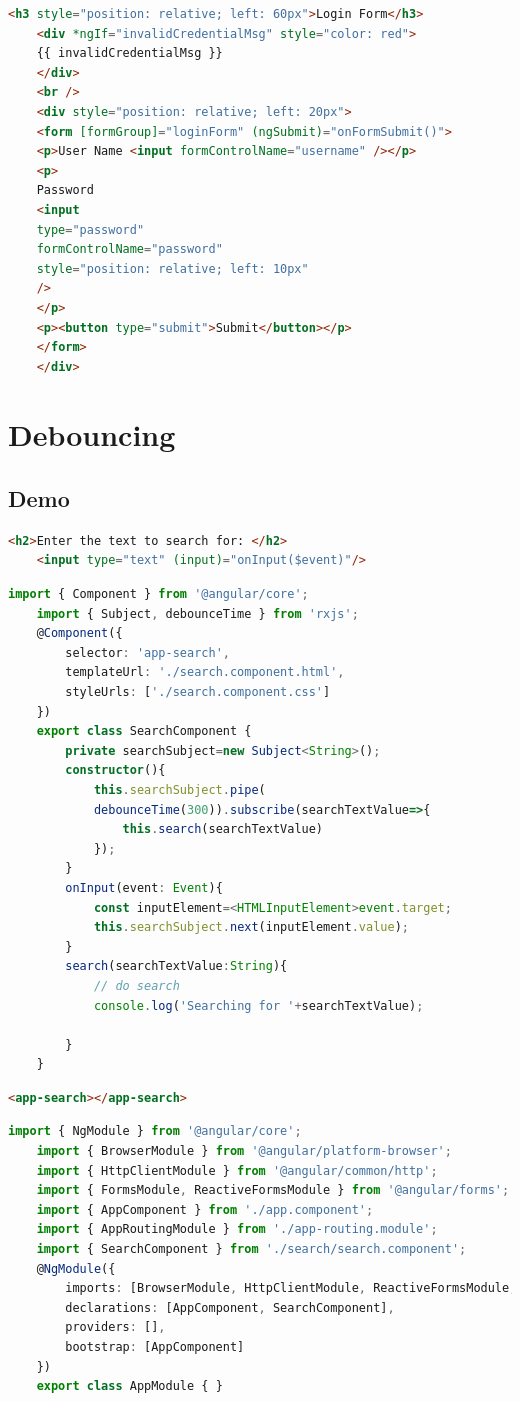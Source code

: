 \documentclass{report}
\begin{document}
\begin{lstlisting}[caption=login.component.html, language=HTML]
	<h3 style="position: relative; left: 60px">Login Form</h3>
	<div *ngIf="invalidCredentialMsg" style="color: red">
	{{ invalidCredentialMsg }}
	</div>
	<br />
	<div style="position: relative; left: 20px">
	<form [formGroup]="loginForm" (ngSubmit)="onFormSubmit()">
	<p>User Name <input formControlName="username" /></p>
	<p>
	Password
	<input
	type="password"
	formControlName="password"
	style="position: relative; left: 10px"
	/>
	</p>
	<p><button type="submit">Submit</button></p>
	</form>
	</div>
\end{lstlisting}

\chapter{Debouncing}
\section{Demo}

\begin{lstlisting}[caption=search-component.html, language=HTML]
	<h2>Enter the text to search for: </h2>
	<input type="text" (input)="onInput($event)"/>
\end{lstlisting}


\begin{lstlisting}[caption=search.component.ts, language=Typescript]
	import { Component } from '@angular/core';
	import { Subject, debounceTime } from 'rxjs';
	@Component({
		selector: 'app-search',
		templateUrl: './search.component.html',
		styleUrls: ['./search.component.css']
	})
	export class SearchComponent {
		private searchSubject=new Subject<String>();
		constructor(){
			this.searchSubject.pipe(
			debounceTime(300)).subscribe(searchTextValue=>{
				this.search(searchTextValue)
			});
		}
		onInput(event: Event){
			const inputElement=<HTMLInputElement>event.target;
			this.searchSubject.next(inputElement.value);
		}
		search(searchTextValue:String){
			// do search
			console.log('Searching for '+searchTextValue);

		}
	}
\end{lstlisting}


\begin{lstlisting}[caption=app.component.html, language=HTML]
	<app-search></app-search>
\end{lstlisting}


\begin{lstlisting}[caption=app.module.ts, language=Typescript]
	import { NgModule } from '@angular/core';
	import { BrowserModule } from '@angular/platform-browser';
	import { HttpClientModule } from '@angular/common/http';
	import { FormsModule, ReactiveFormsModule } from '@angular/forms';
	import { AppComponent } from './app.component';
	import { AppRoutingModule } from './app-routing.module';
	import { SearchComponent } from './search/search.component';
	@NgModule({
		imports: [BrowserModule, HttpClientModule, ReactiveFormsModule,FormsModule, AppRoutingModule],
		declarations: [AppComponent, SearchComponent],
		providers: [],
		bootstrap: [AppComponent]
	})
	export class AppModule { }
\end{lstlisting}
\end{document}
